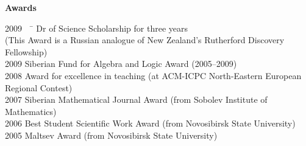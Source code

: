 \documentclass[12pt]{article}
\begin{document}
\centerline{\bf Awards}
\begin{tabbing}
2009 \ \ \=        \> Dr of Science Scholarship for three years\\
           \> (This Award is a Russian analogue of New Zealand's Rutherford Discovery Fellowship) \\
2009       \> Siberian Fund for Algebra and Logic Award (2005--2009)\\
2008       \> Award for excellence in teaching (at ACM-ICPC North-Eastern European Regional Contest)\\
2007       \> Siberian Mathematical Journal Award (from Sobolev Institute of Mathematics)\\
2006       \> Best Student Scientific Work Award (from Novosibirsk State University)\\
2005       \> Maltsev Award (from Novosibirsk State University)\\
\end{tabbing}
\end{document}
